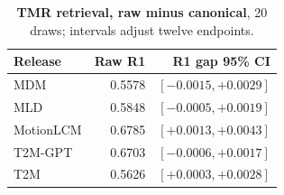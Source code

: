 \begin{table}[t]\centering\footnotesize
\caption{\textbf{TMR retrieval, raw minus canonical}, 20 draws; intervals adjust twelve endpoints.}\label{tab:tmr}
\begin{tabular}{@{}lrr@{}}\toprule
Release&Raw R1&R1 gap 95\% CI\\\midrule
MDM&0.5578&$[-0.0015,+0.0029]$\\
MLD&0.5848&$[-0.0005,+0.0019]$\\
MotionLCM&0.6785&$[+0.0013,+0.0043]$\\
T2M-GPT&0.6703&$[-0.0006,+0.0017]$\\
T2M&0.5626&$[+0.0003,+0.0028]$\\
\bottomrule\end{tabular}\end{table}
